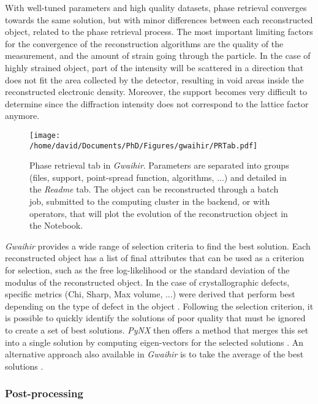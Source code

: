 With well-tuned parameters and high quality datasets, phase retrieval converges towards the same solution, but with minor differences between each reconstructed object, related to the phase retrieval process.
The most important limiting factors for the convergence of the reconstruction algorithms are the quality of the measurement, and the amount of strain going through the particle.
In the case of highly strained object, part of the intensity will be scattered in a direction that does not fit the area collected by the detector, resulting in void areas inside the reconstructed electronic density.
Moreover, the support becomes very difficult to determine since the diffraction intensity does not correspond to the lattice factor anymore.

\begin{figure}[!htb]
    \centering
    \texttt{[image: /home/david/Documents/PhD/Figures/gwaihir/PRTab.pdf]}
    \caption{
    Phase retrieval tab in \textit{Gwaihir}.
    Parameters are separated into groups (files, support, point-spread function, algorithms, ...) and detailed in the \textit{Readme} tab.
    The object can be reconstructed through a batch job, submitted to the computing cluster in the backend, or with operators, that will plot the evolution of the reconstruction object in the Notebook.
    }
    \label{fig:PRT}
\end{figure}

\textit{Gwaihir} provides a wide range of selection criteria to find the best solution.
Each reconstructed object has a list of final attributes that can be used as a criterion for selection, such as the free log-likelihood \parencite{FavreNicolin2020a} or the standard deviation of the modulus of the reconstructed object.
In the case of crystallographic defects, specific metrics (Chi, Sharp, Max volume, ...) were derived that perform best depending on the type of defect in the object \parencite{Ulvestad2017}.
Following the selection criterion, it is possible to quickly identify the solutions of poor quality that must be ignored to create a set of best solutions.
\textit{PyNX} then offers a method that merges this set into a single solution by computing eigen-vectors for the selected solutions \parencite{FavreNicolin2020}.
An alternative approach also available in \textit{Gwaihir} is to take the average of the best solutions \parencite{Ulvestad2014}.

\subsubsection{Post-processing} \label{sec:postprocess}

